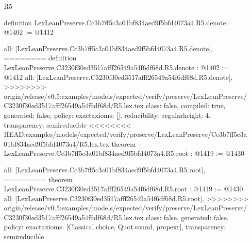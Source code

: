 \begin{lexlean}{R5}
\begin{coremodule}
{{{{{{{{{{{definition LexLeanPreserve.Cc3b7ff5c3a01bf834aed9f5bfd4073a4.R5.denote : @1402 := @1412 {
  all: [LexLeanPreserve.Cc3b7ff5c3a01bf834aed9f5bfd4073a4.R5.denote],
========
definition LexLeanPreserve.C3230f30ed3517afff26549a54f6df68d.R5.denote : @1402 := @1412 {
  all: [LexLeanPreserve.C3230f30ed3517afff26549a54f6df68d.R5.denote],
>>>>>>>> origin/release/v0.5:examples/models/expected/verify/preserve/LexLeanPreserve/C3230f30ed3517afff26549a54f6df68d/R5.lex.tex
  class: false,
  compiled: true,
  generated: false,
  policy: exact{axioms: []},
  reducibility: regular{height: 4},
  transparency: semireducible
}
<<<<<<<< HEAD:examples/models/expected/verify/preserve/LexLeanPreserve/Cc3b7ff5c3a01bf834aed9f5bfd4073a4/R5.lex.tex
theorem LexLeanPreserve.Cc3b7ff5c3a01bf834aed9f5bfd4073a4.R5.root : @1419 := @1430 {
  all: [LexLeanPreserve.Cc3b7ff5c3a01bf834aed9f5bfd4073a4.R5.root],
========
theorem LexLeanPreserve.C3230f30ed3517afff26549a54f6df68d.R5.root : @1419 := @1430 {
  all: [LexLeanPreserve.C3230f30ed3517afff26549a54f6df68d.R5.root],
>>>>>>>> origin/release/v0.5:examples/models/expected/verify/preserve/LexLeanPreserve/C3230f30ed3517afff26549a54f6df68d/R5.lex.tex
  class: false,
  generated: false,
  policy: exact{axioms: [Classical.choice, Quot.sound, propext]},
  transparency: semireducible
}

}}}}}}}}}}}}}
\end{coremodule}
\end{lexlean}
